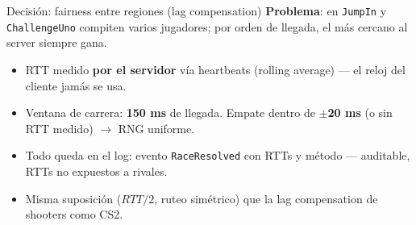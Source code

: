 \documentclass[aspectratio=169,10pt]{beamer}
\begin{document}
\begin{frame}{Decisión: fairness entre regiones (lag compensation)}
  \textbf{Problema}: en \texttt{JumpIn} y \texttt{ChallengeUno} compiten varios jugadores;
  por orden de llegada, el más cercano al server siempre gana.
  \vspace{1mm}
  \begin{center}
  \end{center}
  \vspace{1mm}
  \begin{itemize}\scriptsize
    \item RTT medido \textbf{por el servidor} vía heartbeats (rolling average) --- el reloj del cliente jamás se usa.
    \item Ventana de carrera: \textbf{150 ms} de llegada. Empate dentro de \textbf{$\pm$20 ms} (o sin RTT medido) $\to$ RNG uniforme.
    \item Todo queda en el log: evento \texttt{RaceResolved} con RTTs y método --- auditable, RTTs no expuestos a rivales.
    \item Misma suposición ($RTT/2$, ruteo simétrico) que la lag compensation de shooters como CS2.
  \end{itemize}
\end{frame}
\end{document}
